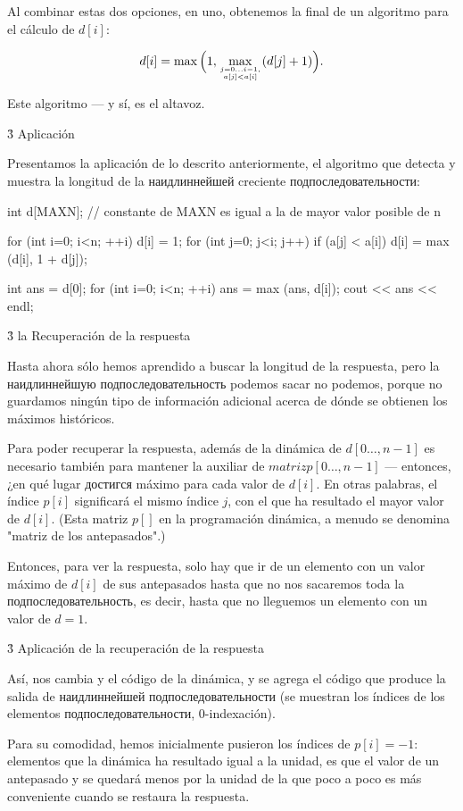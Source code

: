 Al combinar estas dos opciones, en uno, obtenemos la final de un algoritmo para el cálculo de $d[i]$:

$$ d[i] = \max \Big( 1, \max_{j=0 \ldots i-1, \atop a[j] < a[i]} ( d[j] + 1 ) \Big). $$

Este algoritmo --- y sí, es el altavoz.


\h3{ Aplicación }

Presentamos la aplicación de lo descrito anteriormente, el algoritmo que detecta y muestra la longitud de la наидлиннейшей creciente подпоследовательности:

\code
int d[MAXN]; // constante de MAXN es igual a la de mayor valor posible de n

for (int i=0; i<n; ++i) {
d[i] = 1;
for (int j=0; j<i; j++)
if (a[j] < a[i])
d[i] = max (d[i], 1 + d[j]);
}

int ans = d[0];
for (int i=0; i<n; ++i)
ans = max (ans, d[i]);
cout << ans << endl;
\endcode


\h3{ la Recuperación de la respuesta }

Hasta ahora sólo hemos aprendido a buscar la longitud de la respuesta, pero la наидлиннейшую подпоследовательность podemos sacar no podemos, porque no guardamos ningún tipo de información adicional acerca de dónde se obtienen los máximos históricos.

Para poder recuperar la respuesta, además de la dinámica de $d[0 \ldots, n-1]$ es necesario también para mantener la auxiliar de $matriz p[0 \ldots, n-1]$ --- entonces, ¿en qué lugar достигся máximo para cada valor de $d[i]$. En otras palabras, el índice $p[i]$ significará el mismo índice $j$, con el que ha resultado el mayor valor de $d[i]$. (Esta matriz $p[]$ en la programación dinámica, a menudo se denomina "matriz de los antepasados".)

Entonces, para ver la respuesta, solo hay que ir de un elemento con un valor máximo de $d[i]$ de sus antepasados hasta que no nos sacaremos toda la подпоследовательность, es decir, hasta que no lleguemos un elemento con un valor de $d = 1$.


\h3{ Aplicación de la recuperación de la respuesta }

Así, nos cambia y el código de la dinámica, y se agrega el código que produce la salida de наидлиннейшей подпоследовательности (se muestran los índices de los elementos подпоследовательности, 0-indexación).

Para su comodidad, hemos inicialmente pusieron los índices de $p[i] = -1$: elementos que la dinámica ha resultado igual a la unidad, es que el valor de un antepasado y se quedará menos por la unidad de la que poco a poco es más conveniente cuando se restaura la respuesta.

